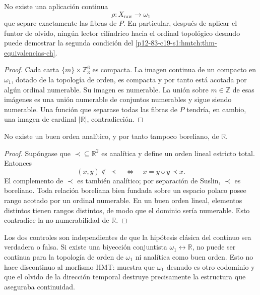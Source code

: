 \begin{theorem}
\label{p12-83-c19-s1:hmtch:thm-no-go-continuo}
No existe una aplicación continua
\[
 \rho:X_{\mathrm{raw}}\longrightarrow\omega_1
\]
que separe exactamente las fibras de \(P\). En particular, después de
aplicar el funtor de olvido, ningún lector cilíndrico hacia el ordinal
topológico desnudo puede demostrar la segunda condición del
\cref{p12-83-c19-s1:hmtch:thm-equivalencias-ch}.
\end{theorem}

\begin{proof}
Cada carta \(\{m\}\times\mathbb Z_3^6\) es compacta. La imagen continua de
un compacto en \(\omega_1\), dotado de la topología de orden, es compacta y
por tanto está acotada por algún ordinal numerable. Su imagen es numerable.
La unión sobre \(m\in\mathbb Z\) de esas imágenes es una unión numerable de
conjuntos numerables y sigue siendo numerable. Una función que separase todas
las fibras de \(P\) tendría, en cambio, una imagen de cardinal
\(|\mathbb R|\), contradicción.
\end{proof}

\begin{theorem}
\label{p12-83-c19-s1:hmtch:thm-no-go-analitico}
No existe un buen orden analítico, y por tanto tampoco boreliano, de
\(\mathbb R\).
\end{theorem}

\begin{proof}
Supóngase que \(\prec\subseteq\mathbb R^2\) es analítica y define un orden
lineal estricto total. Entonces
\[
 (x,y)\notin\prec
 \quad\Longleftrightarrow\quad
 x=y\ \text{o}\ y\prec x.
\]
El complemento de \(\prec\) es también analítico; por separación de Suslin,
\(\prec\) es boreliano. Toda relación boreliana bien fundada sobre un espacio
polaco posee rango acotado por un ordinal numerable. En un buen orden lineal,
elementos distintos tienen rangos distintos, de modo que el dominio sería
numerable. Esto contradice la no numerabilidad de \(\mathbb R\).
\end{proof}

Los dos controles son independientes de que la hipótesis clásica del
continuo sea verdadera o falsa. Si existe una biyección conjuntista
\(\omega_1\leftrightarrow\mathbb R\), no puede ser continua para la
topología de orden de \(\omega_1\) ni analítica como buen orden. Esto no hace
discontinuo al morfismo HMT: muestra que \(\omega_1\) desnudo es otro
codominio y que el olvido de la dirección temporal destruye precisamente la
estructura que aseguraba continuidad.

